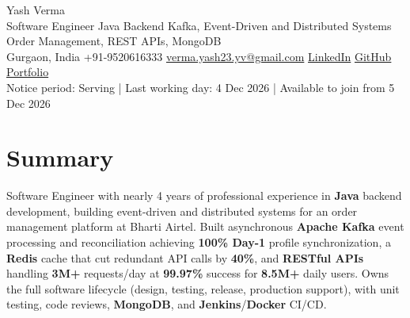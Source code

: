 \documentclass[letterpaper,10pt]{article}
\begin{document}
\begin{center}
  {\Huge Yash Verma} \\
  \small Software Engineer \textbar{} Java Backend \textbar{} Kafka, Event-Driven and Distributed Systems \textbar{} Order Management, REST APIs, MongoDB \\
  \small Gurgaon, India \textbar{} +91-9520616333 \textbar{} \href{mailto:verma.yash23.yv@gmail.com}{verma.yash23.yv@gmail.com} \textbar{}
  \href{https://www.linkedin.com/in/yash-verma-9243a7193/}{LinkedIn} \textbar{}
  \href{https://github.com/yashverma230600}{GitHub} \textbar{}
  \href{https://yashverma230600.github.io/yash-portfolio/}{Portfolio} \\
  Notice period: Serving | Last working day: 4 Dec 2026 | Available to join from 5 Dec 2026
  \vspace{-8pt}
\end{center}

\section{Summary}
\begin{itemize}[leftmargin=0.15in, label={}]
  \small{\item{
    Software Engineer with nearly 4 years of professional experience in \textbf{Java} backend development, building event-driven and distributed systems for an order management platform at Bharti Airtel. Built asynchronous \textbf{Apache Kafka} event processing and reconciliation achieving \textbf{100\% Day-1} profile synchronization, a \textbf{Redis} cache that cut redundant API calls by \textbf{40\%}, and \textbf{RESTful APIs} handling \textbf{3M+} requests/day at \textbf{99.97\%} success for \textbf{8.5M+} daily users. Owns the full software lifecycle (design, testing, release, production support), with unit testing, code reviews, \textbf{MongoDB}, and \textbf{Jenkins}/\textbf{Docker} CI/CD.
  }}
\end{itemize}
\vspace{-8pt}

\end{document}
